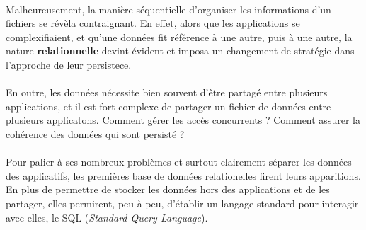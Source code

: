 {  \paragraph{} Malheureusement, la manière séquentielle d'organiser les informations d'un fichiers
  se révèla contraignant. En effet, alors que les applications se complexifiaient, et qu'une données
  fit référence à une autre, puis à une autre, la nature \textbf{relationnelle} devint évident et
  imposa un changement de stratégie dans l'approche de leur persistece.

  \paragraph{} En outre, les données nécessite bien souvent d'être partagé entre plusieurs
  applications, et il est fort complexe de partager un fichier de données entre plusieurs
  applicatons. Comment gérer les accès concurrents ? Comment assurer la cohérence des données qui
  sont persisté ?
  \paragraph{} Pour palier à ses nombreux problèmes et surtout clairement séparer les données des
  applicatifs, les premières base de données relationelles firent leurs apparitions. En plus de
  permettre de stocker les données hors des applications et de les partager, elles permirent, peu à
  peu, d'établir un langage standard pour interagir avec elles, le SQL (\textit{Standard Query
  Language}).
}


